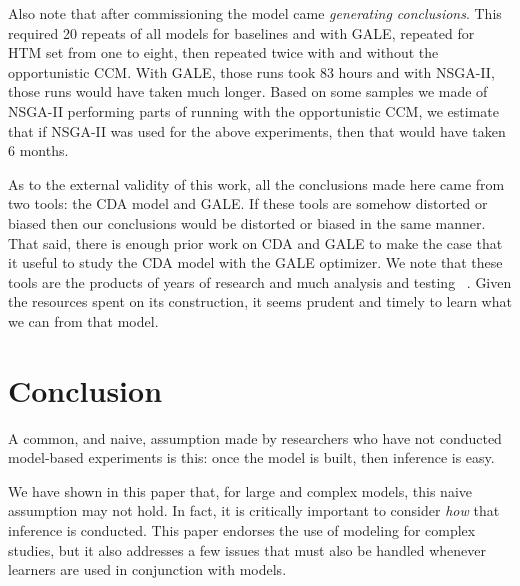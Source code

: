 \documentclass[journal]{IEEEtran}
\newcommand{\tion}[1]{\textsection\ref{sec:#1}}
\begin{document}
Also note that after commissioning the model came {\em generating conclusions}.
This required 20 repeats of all models for baselines and with GALE, repeated for HTM set from one to eight, then repeated twice
with and without the opportunistic CCM.
With GALE, those runs took 83 hours and with NSGA-II, those runs would have taken much longer.
Based on some samples we made of NSGA-II performing parts of running with the opportunistic CCM, we estimate that if NSGA-II was used for the above experiments, then that would have taken 6 months.


As to the external validity of this work,
all the conclusions made here came from two tools: the CDA model and GALE. 
If these tools are somehow distorted or biased then our conclusions would be distorted or biased in the same manner.
That said,
there is enough  prior work on CDA and GALE  to make the case that it useful to study the CDA model with the GALE optimizer.
We note that these tools are the products of years of research and much analysis and testing ~\cite{Kim2011,Pritchett2011,Feigh2012,Kim2013,Pritchett2013,Pritchett2014, Feigh2014, krall14aaai,krallphd,galepaper}. 
Given the resources spent on its construction, it seems prudent and timely to learn what we can from that model.





\section{Conclusion}

A common, and naive, assumption made by researchers who have not conducted model-based experiments is this: once the model is built, then inference is easy.

We have shown in this paper that, for large and complex models, this naive assumption may not hold.
In fact, it is critically important to consider {\em how} that inference is conducted.
This paper endorses the use of modeling for complex studies, but it also addresses a few issues that must also be handled whenever learners are used in conjunction with models.  
\end{document}
